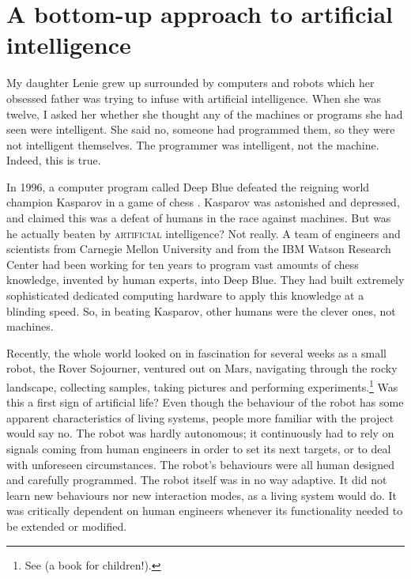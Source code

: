 \section{A bottom-up approach to artificial intelligence}

 My daughter Lenie grew up surrounded by computers and 
robots which her obsessed father was trying to infuse
with artificial intelligence. When she was twelve, I asked
her whether she thought any of the machines or 
programs she had seen were intelligent. 
She said no, someone had programmed them, so they were
not intelligent themselves. The programmer was 
intelligent, not the machine. Indeed, this is true. 

In 1996, a computer program called Deep Blue
defeated the reigning world champion Kasparov in a game of 
chess \citep{Newborn:1996}.
Kasparov was astonished
and depressed, and claimed this was a defeat of humans in 
the 
race against machines. But was he actually beaten by {\scshape artificial}
intelligence? Not really. A team of engineers and scientists
from Carnegie Mellon University and from the IBM Watson 
Research Center had been working for ten years to program 
vast amounts of chess knowledge, invented by
human experts, into Deep Blue. They had built extremely 
sophisticated dedicated computing hardware to
apply this knowledge at a blinding speed. So, in beating Kasparov, 
other humans were the clever ones, not machines. 

Recently, the whole world looked on in fascination
for several weeks as a small robot, the Rover Sojourner, ventured
out on Mars, navigating through the rocky landscape, collecting
samples, taking pictures and performing 
experiments.\footnote{
See \cite{Wunsch:1998} (a book for children!).}
Was this a first sign of artificial life? Even though the 
behaviour of the robot has some apparent characteristics
of living systems, people more
familiar with the project would say no. 
The robot was hardly autonomous; it continuously had to rely
on signals coming from human engineers in order to set
its next targets, or to deal with unforeseen circumstances. 
The robot's behaviours were
all human designed and carefully programmed. The robot 
itself was in no way adaptive. It did not learn new behaviours
nor new interaction modes, as a living system would do.
It was critically dependent on human engineers whenever its
functionality needed to be extended or modified. 

